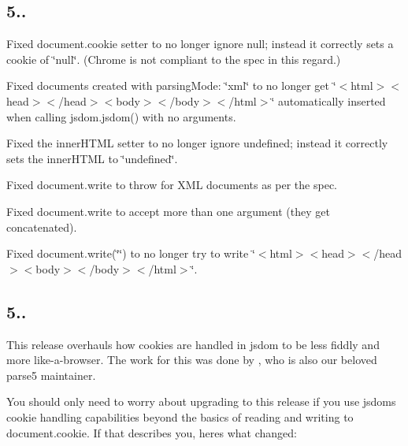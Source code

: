 \subsection*{5..}


\begin{DoxyItemize}
\item Fixed {\ttfamily document.\+cookie} setter to no longer ignore {\ttfamily null}; instead it correctly sets a cookie of {\ttfamily \char`\"{}null\char`\"{}}. (Chrome is not compliant to the spec in this regard.)
\item Fixed documents created with {\ttfamily parsing\+Mode\+: \char`\"{}xml\char`\"{}} to no longer get {\ttfamily \char`\"{}$<$html$>$$<$head$>$$<$/head$>$$<$body$>$$<$/body$>$$<$/html$>$\char`\"{}} automatically inserted when calling {\ttfamily jsdom.\+jsdom()} with no arguments.
\item Fixed the {\ttfamily inner\+H\+T\+ML} setter to no longer ignore {\ttfamily undefined}; instead it correctly sets the inner\+H\+T\+ML to {\ttfamily \char`\"{}undefined\char`\"{}}.
\item Fixed {\ttfamily document.\+write} to throw for X\+ML documents as per the spec.
\item Fixed {\ttfamily document.\+write} to accept more than one argument (they get concatenated).
\item Fixed {\ttfamily document.\+write(\char`\"{}\char`\"{})} to no longer try to write {\ttfamily \char`\"{}$<$html$>$$<$head$>$$<$/head$>$$<$body$>$$<$/body$>$$<$/html$>$\char`\"{}}.
\end{DoxyItemize}

\subsection*{5..}

This release overhauls how cookies are handled in jsdom to be less fiddly and more like-\/a-\/browser. The work for this was done by \href{https://github.com/inikulin}{\tt }, who is also our beloved parse5 maintainer.

You should only need to worry about upgrading to this release if you use jsdom\textquotesingle{}s cookie handling capabilities beyond the basics of reading and writing to {\ttfamily document.\+cookie}. If that describes you, here\textquotesingle{}s what changed\+:


